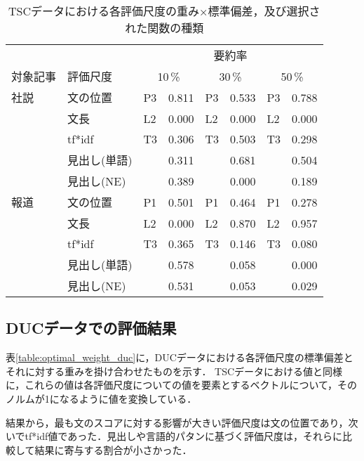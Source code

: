 \begin{table}[t]\small
\caption{TSCデータにおける各評価尺度の重み×標準偏差，及び選択された関数の種類}
\label{table:optimal_weight_tsc}
\begin{center}
\begin{tabular}{l|l|lr|lr|lr} \hline
         &              & \multicolumn{6}{|c}{要約率} \\ \cline{3-8}
対象記事 & 評価尺度     &  \multicolumn{2}{|c|}{10\,\%} & \multicolumn{2}{|c|}{30\,\%} & \multicolumn{2}{|c}{50\,\%} \\ \hline
社説     & 文の位置     & P3 & 0.811 & P3  & 0.533 & P3  & 0.788  \\
         & 文長         & L2 & 0.000 & L2  & 0.000 & L2  & 0.000  \\
         & tf*idf       & T3 & 0.306 & T3  & 0.503 & T3  & 0.298  \\
         & 見出し(単語) &    & 0.311 &     & 0.681 &     & 0.504  \\
         & 見出し(NE)   &    & 0.389 &     & 0.000 &     & 0.189  \\[2mm] \hline
報道     & 文の位置     & P1 & 0.501 & P1  & 0.464 & P1  & 0.278 \\
         & 文長         & L2 & 0.000 & L2  & 0.870 & L2  & 0.957 \\
         & tf*idf       & T3 & 0.365 & T3  & 0.146 & T3  & 0.080 \\
         & 見出し(単語) &    & 0.578 &     & 0.058 &     & 0.000 \\
         & 見出し(NE)   &    & 0.531 &     & 0.053 &     & 0.029 \\ \hline
\end{tabular} 
\end{center}
\end{table}

\subsection{DUCデータでの評価結果}

表\ref{table:optimal_weight_duc}に，DUCデータにおける各評価尺度の標準偏差とそれに対する重みを掛け合わせたものを示す．
TSCデータにおける値と同様に，これらの値は各評価尺度についての値を要素とするベクトルについて，そのノルムが1になるように値を変換している．

結果から，最も文のスコアに対する影響が大きい評価尺度は文の位置であり，次いでtf*idf値であった．見出しや言語的パタンに基づく評価尺度は，それらに比較して結果に寄与する割合が小さかった．

